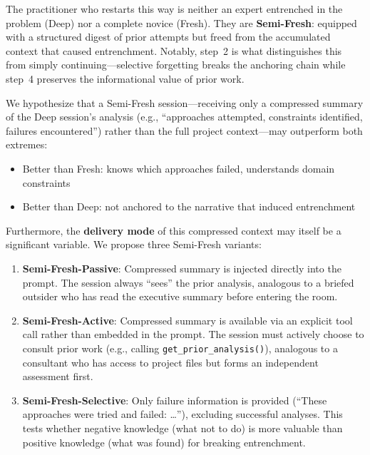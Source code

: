 \documentclass[11pt]{article}
\begin{document}
The practitioner who restarts this way is neither an expert entrenched in the problem (Deep) nor a complete novice (Fresh). They are \textbf{Semi-Fresh}: equipped with a structured digest of prior attempts but freed from the accumulated context that caused entrenchment. Notably, step~2 is what distinguishes this from simply continuing---selective forgetting breaks the anchoring chain while step~4 preserves the informational value of prior work.

We hypothesize that a Semi-Fresh session---receiving only a compressed summary of the Deep session's analysis (e.g., ``approaches attempted, constraints identified, failures encountered'') rather than the full project context---may outperform both extremes:

\begin{itemize}[leftmargin=1.5em]
  \item Better than Fresh: knows which approaches failed, understands domain constraints
  \item Better than Deep: not anchored to the narrative that induced entrenchment
\end{itemize}

Furthermore, the \textbf{delivery mode} of this compressed context may itself be a significant variable. We propose three Semi-Fresh variants:

\begin{enumerate}[label=\arabic*., leftmargin=1.5em]
  \item \textbf{Semi-Fresh-Passive}: Compressed summary is injected directly into the prompt. The session always ``sees'' the prior analysis, analogous to a briefed outsider who has read the executive summary before entering the room.
  \item \textbf{Semi-Fresh-Active}: Compressed summary is available via an explicit tool call rather than embedded in the prompt. The session must actively choose to consult prior work (e.g., calling \texttt{get\_prior\_analysis()}), analogous to a consultant who has access to project files but forms an independent assessment first.
  \item \textbf{Semi-Fresh-Selective}: Only failure information is provided (``These approaches were tried and failed: \ldots''), excluding successful analyses. This tests whether negative knowledge (what not to do) is more valuable than positive knowledge (what was found) for breaking entrenchment.
\end{enumerate}
\end{document}
